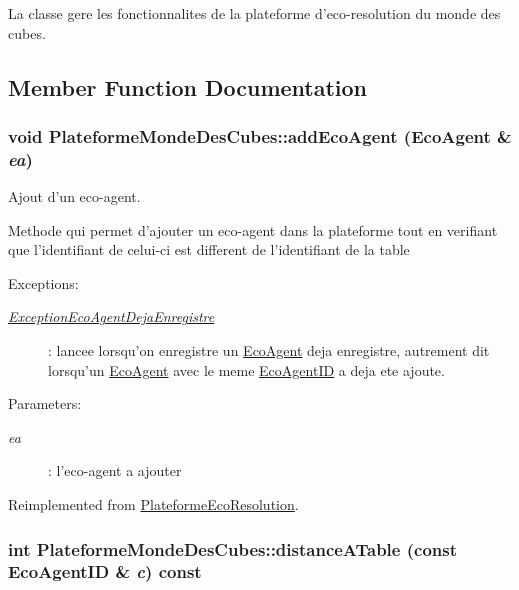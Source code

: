 La classe gere les fonctionnalites de la plateforme d'eco-resolution du monde des cubes. 

\subsection{Member Function Documentation}
\hypertarget{classPlateformeMondeDesCubes_6fb5b9ececb0e7893b2c7ff5531cb3b1}{
\subsubsection[{addEcoAgent}]{\setlength{\rightskip}{0pt plus 5cm}void PlateformeMondeDesCubes::addEcoAgent ({\bf EcoAgent} \& {\em ea})}}
\label{classPlateformeMondeDesCubes_6fb5b9ececb0e7893b2c7ff5531cb3b1}


Ajout d'un eco-agent. 

Methode qui permet d'ajouter un eco-agent dans la plateforme tout en verifiant que l'identifiant de celui-ci est different de l'identifiant de la table \begin{Desc}
\item[Exceptions:]
\begin{description}
\item[{\em \hyperlink{classExceptionEcoAgentDejaEnregistre}{ExceptionEcoAgentDejaEnregistre}}]: lancee lorsqu'on enregistre un \hyperlink{classEcoAgent}{EcoAgent} deja enregistre, autrement dit lorsqu'un \hyperlink{classEcoAgent}{EcoAgent} avec le meme \hyperlink{classEcoAgentID}{EcoAgentID} a deja ete ajoute. \end{description}
\end{Desc}
\begin{Desc}
\item[Parameters:]
\begin{description}
\item[{\em ea}]: l'eco-agent a ajouter \end{description}
\end{Desc}


Reimplemented from \hyperlink{classPlateformeEcoResolution_6fdb4c8ecc62252da4326d9763d4f28d}{PlateformeEcoResolution}.\hypertarget{classPlateformeMondeDesCubes_4a5d7a96766cf9a3e1acae5b3d8263fa}{
\subsubsection[{distanceATable}]{\setlength{\rightskip}{0pt plus 5cm}int PlateformeMondeDesCubes::distanceATable (const {\bf EcoAgentID} \& {\em c}) const}}
\label{classPlateformeMondeDesCubes_4a5d7a96766cf9a3e1acae5b3d8263fa}


